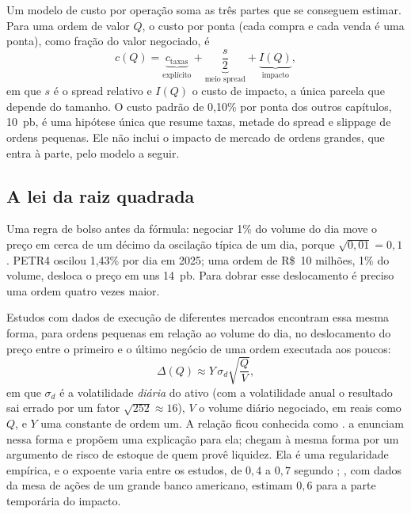 Um modelo de custo por operação soma as três partes que se conseguem estimar. Para uma ordem de valor $Q$, o custo por ponta (cada compra e cada venda é uma ponta), como fração do valor negociado, é
\begin{equation}
  c(Q) = \underbrace{c_{\text{taxas}}}_{\text{explícito}} + \underbrace{\frac{s}{2}}_{\text{meio spread}} + \underbrace{I(Q)}_{\text{impacto}} ,
  \label{eq:c14-custo}
\end{equation}
em que $s$ é o spread relativo e $I(Q)$ o custo de impacto, a única parcela que depende do tamanho. O custo padrão de 0,10\% por ponta dos outros capítulos, 10~pb, é uma hipótese única que resume taxas, metade do spread e slippage de ordens pequenas. Ele não inclui o impacto de mercado de ordens grandes, que entra à parte, pelo modelo a seguir.

\subsection{A lei da raiz quadrada}

Uma regra de bolso antes da fórmula: negociar 1\% do volume do dia move o preço em cerca de um décimo da oscilação típica de um dia, porque $\sqrt{0,01} = 0,1$. PETR4 oscilou 1,43\% por dia em 2025; uma ordem de R\$~10 milhões, 1\% do volume, desloca o preço em uns 14~pb. Para dobrar esse deslocamento é preciso uma ordem quatro vezes maior.

Estudos com dados de execução de diferentes mercados encontram essa mesma forma, para ordens pequenas em relação ao volume do dia, no deslocamento do preço entre o primeiro e o último negócio de uma ordem executada aos poucos:
\begin{equation}
  \Delta(Q) \approx Y \, \sigma_d \sqrt{\frac{Q}{V}} ,
  \label{eq:c14-raiz}
\end{equation}
em que $\sigma_d$ é a volatilidade \emph{diária} do ativo (com a volatilidade anual o resultado sai errado por um fator $\sqrt{252} \approx 16$), $V$ o volume diário negociado, em reais como $Q$, e $Y$ uma constante de ordem um. A relação ficou conhecida como . \citet{toth2011} a enunciam nessa forma e propõem uma explicação para ela; \citet{grinold2000} chegam à mesma forma por um argumento de risco de estoque de quem provê liquidez. Ela é uma regularidade empírica, e o expoente varia entre os estudos, de $0,4$ a $0,7$ segundo \citet{toth2011}; \citet{almgren2005}, com dados da mesa de ações de um grande banco americano, estimam $0,6$ para a parte temporária do impacto.


